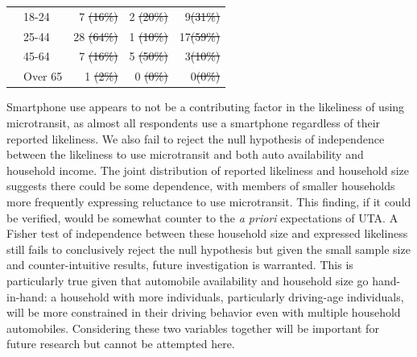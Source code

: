 \documentclass[smartcities,article,submit,moreauthors,pdftex]{mdpi} %
\providecommand{\DIFadd}[1]{{\protect\color{blue}\uwave{#1}}} %
\providecommand{\DIFdel}[1]{{\protect\color{red}\sout{#1}}}                      %
\providecommand{\DIFaddFL}[1]{\DIFadd{#1}} %
\providecommand{\DIFdelFL}[1]{\DIFdel{#1}} %
\providecommand{\DIFaddbeginFL}{} %
\providecommand{\DIFaddendFL}{} %
\providecommand{\DIFdelbeginFL}{} %
\providecommand{\DIFdelendFL}{} %
\begin{document}
\begin{table}
\begin{tabular}[t]{llrrr}
\DIFaddFL{\hspace{1em} }& \DIFaddendFL 18-24 & 7 \DIFdelbeginFL \DIFdelFL{(16\%)             }\DIFdelendFL & 2 \DIFdelbeginFL \DIFdelFL{(20\%)    }\DIFdelendFL & 9\DIFdelbeginFL \DIFdelFL{(31\%)         }\DIFdelendFL \\
\DIFdelbeginFL %
\DIFdelendFL \DIFaddbeginFL 

\DIFaddFL{\hspace{1em} }& \DIFaddendFL 25-44 & 28 \DIFdelbeginFL \DIFdelFL{(64\%)            }\DIFdelendFL & 1 \DIFdelbeginFL \DIFdelFL{(10\%)    }\DIFdelendFL & 17\DIFdelbeginFL \DIFdelFL{(59\%)        }\DIFdelendFL \\
\DIFdelbeginFL %
\DIFdelendFL \DIFaddbeginFL 

\DIFaddFL{\hspace{1em} }& \DIFaddendFL 45-64 & 7 \DIFdelbeginFL \DIFdelFL{(16\%)             }\DIFdelendFL & 5 \DIFdelbeginFL \DIFdelFL{(50\%)    }\DIFdelendFL & 3\DIFdelbeginFL \DIFdelFL{(10\%)         }\DIFdelendFL \\
\DIFdelbeginFL %
\DIFdelendFL \DIFaddbeginFL 

\DIFaddFL{\hspace{1em} }& \DIFaddendFL Over 65 & 1 \DIFdelbeginFL \DIFdelFL{(2\%)              }\DIFdelendFL & 0 \DIFdelbeginFL \DIFdelFL{(0\%)     }\DIFdelendFL & 0\DIFdelbeginFL \DIFdelFL{(0\%)         }\DIFdelendFL \\
\bottomrule
\DIFdelbeginFL %

\DIFdelendFL \end{tabular}
\end{table}

Smartphone use appears to not be a contributing factor in the likeliness of
using microtransit, as almost all respondents use a smartphone regardless of
their reported likeliness. We also fail to reject the null hypothesis of
independence between the likeliness to use microtransit and both auto
availability and household income. The joint distribution of reported likeliness
and household size suggests there could be some dependence, with members of
smaller households more frequently expressing reluctance to use microtransit.
This finding, if it could be verified, would be somewhat counter to the \emph{a
priori} expectations of UTA. A Fisher test of independence between these
household size and expressed likeliness still fails to conclusively reject the
null hypothesis but given the small sample size and counter-intuitive results,
future investigation is warranted. This is particularly true given that
automobile availability and household size go hand-in-hand: a household with
more individuals, particularly driving-age individuals, will be more constrained
in their driving behavior even with multiple household automobiles. Considering
these two variables together will be important for future research but cannot be
attempted here.
\end{document}
